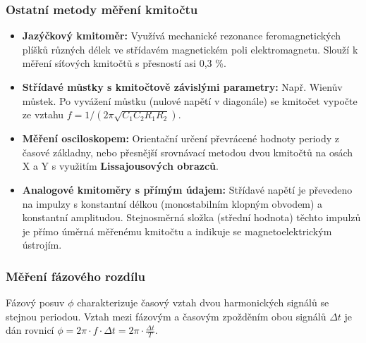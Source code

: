     \subsubsection{Ostatní metody měření kmitočtu}
        \begin{itemize}
            \item \textbf{Jazýčkový kmitoměr:} Využívá mechanické rezonance feromagnetických plíšků různých délek ve střídavém magnetickém poli elektromagnetu. Slouží k měření síťových kmitočtů s přesností asi 0,3 \%.
            \item \textbf{Střídavé můstky s kmitočtově závislými parametry:} Např. Wienův můstek. Po vyvážení můstku (nulové napětí v diagonále) se kmitočet vypočte ze vztahu $f = 1/(2\pi \sqrt{C_1C_2R_1R_2})$.
            \item \textbf{Měření osciloskopem:} Orientační určení převrácené hodnoty periody z časové základny, nebo přesnější srovnávací metodou dvou kmitočtů na osách X a Y s využitím \textbf{Lissajousových obrazců}.
            \item \textbf{Analogové kmitoměry s přímým údajem:} Střídavé napětí je převedeno na impulzy s konstantní délkou (monostabilním klopným obvodem) a konstantní amplitudou. Stejnosměrná složka (střední hodnota) těchto impulzů je přímo úměrná měřenému kmitočtu a indikuje se magnetoelektrickým ústrojím.
        \end{itemize}
    \subsubsection{Měření fázového rozdílu}
        Fázový posuv $\phi$ charakterizuje časový vztah dvou harmonických signálů se stejnou periodou. Vztah mezi fázovým a časovým zpožděním obou signálů $\Delta t$ je dán rovnicí $\phi = 2\pi \cdot f \cdot \Delta t = 2\pi \cdot \frac{\Delta t}{T}$.
        
